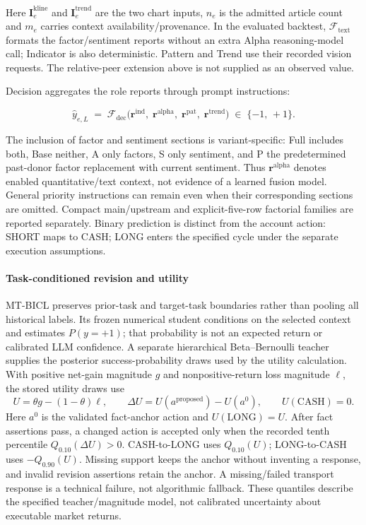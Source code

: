 Here $\mathbf{I}^{\mathrm{kline}}_e$ and $\mathbf{I}^{\mathrm{trend}}_e$ are the two chart inputs, $n_e$ is the admitted article count and $m_e$ carries context availability/provenance. In the evaluated backtest, $\mathcal{F}_{\mathrm{text}}$ formats the factor/sentiment reports without an extra Alpha reasoning-model call; Indicator is also deterministic. Pattern and Trend use their recorded vision requests. The relative-peer extension above is not supplied as an observed value.

Decision aggregates the role reports through prompt instructions:

\begin{equation}
    \hat{y}_{e,L} \;=\; \mathcal{F}_{\mathrm{dec}}\!\bigl(
        \mathbf{r}^{\mathrm{ind}},\;
        \mathbf{r}^{\mathrm{alpha}},\;
        \mathbf{r}^{\mathrm{pat}},\;
        \mathbf{r}^{\mathrm{trend}}
    \bigr) \;\in\; \{-1,\, +1\}.
    \label{eq:decision}
\end{equation}


The inclusion of factor and sentiment sections is variant-specific: Full includes both, Base neither, A only factors, S only sentiment, and P the predetermined past-donor factor replacement with current sentiment. Thus $\mathbf{r}^{\mathrm{alpha}}$ denotes enabled quantitative/text context, not evidence of a learned fusion model. General priority instructions can remain even when their corresponding sections are omitted. Compact main/upstream and explicit-five-row factorial families are reported separately. Binary prediction is distinct from the account action: SHORT maps to CASH; LONG enters the specified cycle under the separate execution assumptions.

\paragraph{Task-conditioned revision and utility}
MT-BICL preserves prior-task and target-task boundaries rather than pooling all historical labels. Its frozen numerical student conditions on the selected context and estimates $P(y=+1)$; that probability is not an expected return or calibrated LLM confidence. A separate hierarchical Beta--Bernoulli teacher supplies the posterior success-probability draws used by the utility calculation. With positive net-gain magnitude $g$ and nonpositive-return loss magnitude $\ell$, the stored utility draws use
\begin{equation}
 U=\theta g-(1-\theta)\ell,\qquad
 \Delta U=U(a^{\mathrm{proposed}})-U(a^0),\qquad U(\mathrm{CASH})=0.
 \label{eq:revision_utility}
\end{equation}
Here $a^0$ is the validated fact-anchor action and $U(\mathrm{LONG})=U$. After fact assertions pass, a changed action is accepted only when the recorded tenth percentile $Q_{0.10}(\Delta U)>0$. CASH-to-LONG uses $Q_{0.10}(U)$; LONG-to-CASH uses $-Q_{0.90}(U)$. Missing support keeps the anchor without inventing a response, and invalid revision assertions retain the anchor. A missing/failed transport response is a technical failure, not algorithmic fallback. These quantiles describe the specified teacher/magnitude model, not calibrated uncertainty about executable market returns.

